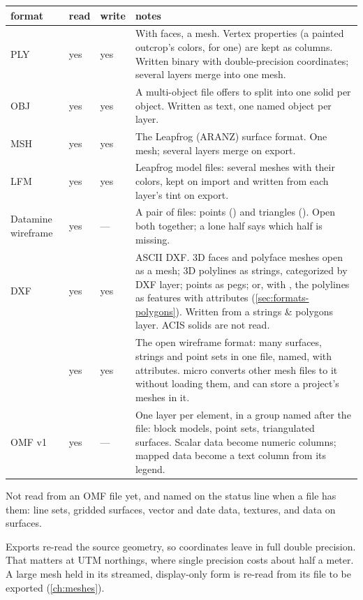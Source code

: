 \begin{tabularx}{\linewidth}{@{}p{27mm}p{9mm}p{9mm}L@{}}
\toprule
format & read & write & notes \\
\midrule
PLY  & yes & yes & With faces, a mesh. Vertex properties (a painted outcrop's colors,
  for one) are kept as columns. Written binary with double-precision coordinates; several layers
  merge into one mesh. \\
OBJ  & yes & yes & A multi-object file offers to split into one solid per object.
  Written as text, one named object per layer. \\
MSH  & yes & yes & The Leapfrog (ARANZ) surface format. One mesh; several layers merge on
  export. \\
LFM  & yes & yes & Leapfrog model files: several meshes with their colors, kept on
  import and written from each layer's tint on export. \\
Datamine wireframe & yes & — & A pair of files: points () and triangles
  (). Open both together; a lone half says which half is missing. \\
DXF  & yes & yes & ASCII DXF. 3D faces and polyface meshes open as a mesh; 3D polylines as
  strings, categorized by DXF layer; points as pegs; or, with , the polylines as
  features with attributes (\cref{sec:formats-polygons}). Written from a strings \& polygons layer.
  ACIS solids are not read. \\
 & yes & yes & The open wireframe format: many surfaces, strings and point sets in one
  file, named, with attributes. micro converts other mesh files to it without loading them, and can
  store a project's meshes in it. \\
OMF v1  & yes & — & One layer per element, in a group named after the file: block
  models, point sets, triangulated surfaces. Scalar data become numeric columns; mapped data become
  a text column from its legend. \\
\bottomrule
\end{tabularx}

\begin{note}
Not read from an OMF file yet, and named on the status line when a file has them: line sets, gridded
surfaces, vector and date data, textures, and data on surfaces.
\end{note}

Exports re-read the source geometry, so coordinates leave in full double precision. That matters at
UTM northings, where single precision costs about half a meter. A large mesh held in its streamed,
display-only form is re-read from its file to be exported (\cref{ch:meshes}).

